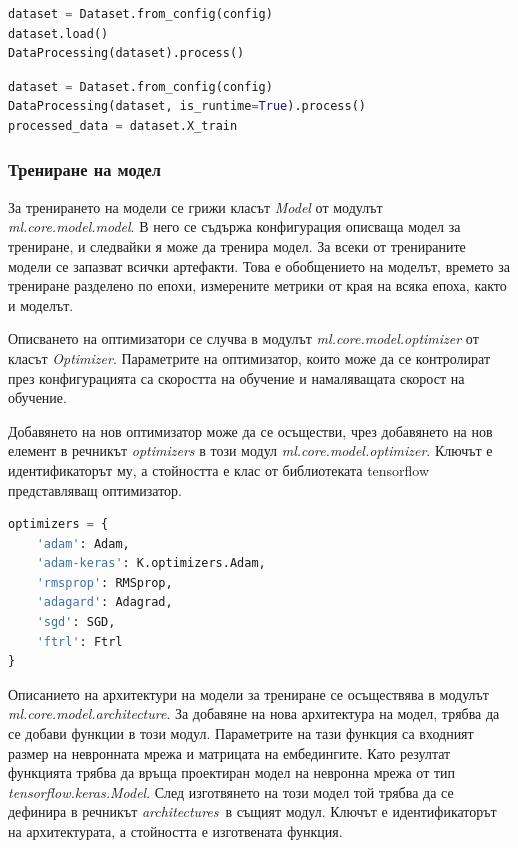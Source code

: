 \documentclass{article}
\newcounter{subsubsubsection}[subsubsection]
\begin{document}
\begin{lstlisting}[language=Python, caption=Обработка на наборът от данни за трениране на невронната мрежа]
dataset = Dataset.from_config(config)
dataset.load()
DataProcessing(dataset).process()
\end{lstlisting}

\begin{lstlisting}[language=Python, caption=Обработка на извлечените записи от социалните мрежи за изготвяне на предложенията]
dataset = Dataset.from_config(config)
DataProcessing(dataset, is_runtime=True).process()
processed_data = dataset.X_train
\end{lstlisting}

\subsubsection{Трениране на модел}

За тренирането на модели се грижи класът \textit{Model} от модулът \textit{ml.core.model.model}. В него се съдържа
конфигурация описваща модел за трениране, и следвайки я може да тренира модел. За всеки от тренираните модели се
запазват всички артефакти. Това е обобщението на моделът, времето за трениране разделено по епохи, измерените метрики
от края на всяка епоха, както и моделът.


Описването на оптимизатори се случва в модулът \textit{ml.core.model.optimizer} от класът \textit{Optimizer}.
Параметрите на оптимизатор, които може да се контролират през конфигурацията са скоростта на обучение и намаляващата
скорост на обучение.

Добавянето на нов оптимизатор може да се осъществи, чрез добавянето на нов елемент в речникът \textit{optimizers} в
този модул \textit{ml.core.model.optimizer}. Ключът е идентификаторът му, а стойността е клас от библиотеката
tensorflow представляващ оптимизатор.

\begin{lstlisting}[language=Python, caption=Дефиниране на оптимизатор]
optimizers = {
    'adam': Adam,
    'adam-keras': K.optimizers.Adam,
    'rmsprop': RMSprop,
    'adagard': Adagrad,
    'sgd': SGD,
    'ftrl': Ftrl
}
\end{lstlisting}


Описанието на архитектури на модели за трениране се осъществява в модулът \textit{ml.core.model.architecture}. За
добавяне на нова архитектура на модел, трябва да се добави функции в този модул. Параметрите на тази функция са
входният размер на невронната мрежа и матрицата на ембедингите. Като резултат функцията трябва да връща проектиран
модел на невронна мрежа от тип \textit{tensorflow.keras.Model}. След изготвянето на този модел той трябва да се
дефинира в речникът \textit{architectures} в същият модул. Ключът е идентификаторът на архитектурата, а стойността е
изготвената функция.
\end{document}

